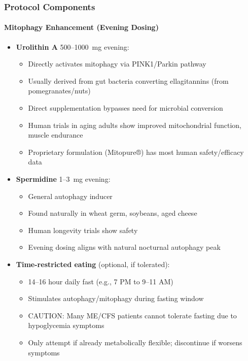 \subsubsection{Protocol Components}

\paragraph{Mitophagy Enhancement (Evening Dosing)}

\begin{itemize}
    \item \textbf{Urolithin A} 500--1000~mg evening:
    \begin{itemize}
        \item Directly activates mitophagy via PINK1/Parkin pathway
        \item Usually derived from gut bacteria converting ellagitannins (from pomegranates/nuts)
        \item Direct supplementation bypasses need for microbial conversion
        \item Human trials in aging adults show improved mitochondrial function, muscle endurance
        \item Proprietary formulation (Mitopure®) has most human safety/efficacy data
    \end{itemize}

    \item \textbf{Spermidine} 1--3~mg evening:
    \begin{itemize}
        \item General autophagy inducer
        \item Found naturally in wheat germ, soybeans, aged cheese
        \item Human longevity trials show safety
        \item Evening dosing aligns with natural nocturnal autophagy peak
    \end{itemize}

    \item \textbf{Time-restricted eating} (optional, if tolerated):
    \begin{itemize}
        \item 14--16 hour daily fast (e.g., 7 PM to 9--11 AM)
        \item Stimulates autophagy/mitophagy during fasting window
        \item CAUTION: Many ME/CFS patients cannot tolerate fasting due to hypoglycemia symptoms
        \item Only attempt if already metabolically flexible; discontinue if worsens symptoms
    \end{itemize}
\end{itemize}

